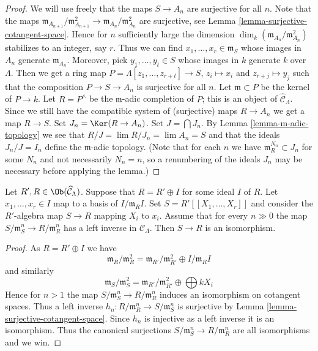 \begin{proof}
We will use freely that the maps $S \to A_n$ are surjective for all $n$.
Note that the maps
$\mathfrak m_{A_{n + 1}}/\mathfrak m_{A_{n + 1}}^2 \to
\mathfrak m_{A_n}/\mathfrak m_{A_n}^2$ are surjective, see
Lemma \ref{lemma-surjective-cotangent-space}.
Hence for $n$ sufficiently large the dimension
$\dim_k (\mathfrak m_{A_n}/\mathfrak m_{A_n}^2)$ stabilizes to an
integer, say $r$.
Thus we can find $x_1, \ldots, x_r \in \mathfrak m_S$ whose images in
$A_n$ generate $\mathfrak m_{A_n}$. Moreover, pick $y_1, \ldots, y_t \in S$
whose images in $k$ generate $k$ over $\Lambda$. Then we get a ring map
$P = \Lambda[z_1, \ldots, z_{r + t}] \to S$, $z_i \mapsto x_i$ and
$z_{r + j} \mapsto y_j$ such that the composition
$P \to S \to A_n$ is surjective for all $n$. Let $\mathfrak m \subset P$
be the kernel of $P \to k$. Let $R = P^\wedge$ be the $\mathfrak m$-adic
completion of $P$; this is an object of $\widehat{\mathcal{C}}_\Lambda$.
Since we still have the compatible system of (surjective) maps $R \to A_n$
we get a map $R \to S$. Set $J_n = \Ker(R \to A_n)$.
Set $J = \bigcap J_n$. By
Lemma \ref{lemma-m-adic-topology}
we see that $R/J = \lim R/J_n = \lim A_n = S$
and that the ideals $J_n/J = I_n$ define the $\mathfrak m$-adic topology.
(Note that for each $n$ we have $\mathfrak m_R^{N_n} \subset J_n$ for
some $N_n$ and not necessarily $N_n = n$, so a renumbering of the ideals
$J_n$ may be necessary before applying the lemma.)
\end{proof}

\begin{lemma}
\label{lemma-power-series}
Let $R', R \in \Ob(\widehat{\mathcal{C}}_\Lambda)$. Suppose that
$R = R' \oplus I$ for some ideal $I$ of $R$. Let $x_1, \ldots, x_r \in I$
map to a basis of $I/\mathfrak m_R I$. Set $S = R'[[X_1, \ldots, X_r]]$
and consider the $R'$-algebra map $S \to R$ mapping $X_i$ to $x_i$.
Assume that for every $n \gg 0$ the map
$S/\mathfrak m_S^n \to R/\mathfrak m_R^n$ has a left inverse in
$\mathcal{C}_\Lambda$. Then $S \to R$ is an isomorphism.
\end{lemma}

\begin{proof}
As $R = R' \oplus I$ we have
$$
\mathfrak m_R/\mathfrak m_R^2 =
\mathfrak m_{R'}/\mathfrak m_{R'}^2 \oplus I/\mathfrak m_RI
$$
and similarly
$$
\mathfrak m_S/\mathfrak m_S^2 =
\mathfrak m_{R'}/\mathfrak m_{R'}^2 \oplus \bigoplus kX_i
$$
Hence for $n > 1$ the map $S/\mathfrak m_S^n \to R/\mathfrak m_R^n$
induces an isomorphism on cotangent spaces. Thus a left inverse
$h_n : R/\mathfrak m_R^n \to S/\mathfrak m_S^n$ is surjective by
Lemma \ref{lemma-surjective-cotangent-space}.
Since $h_n$ is injective as a left inverse it is an isomorphism.
Thus the canonical surjections $S/\mathfrak m_S^n \to R/\mathfrak m_R^n$
are all isomorphisms and we win.
\end{proof}




